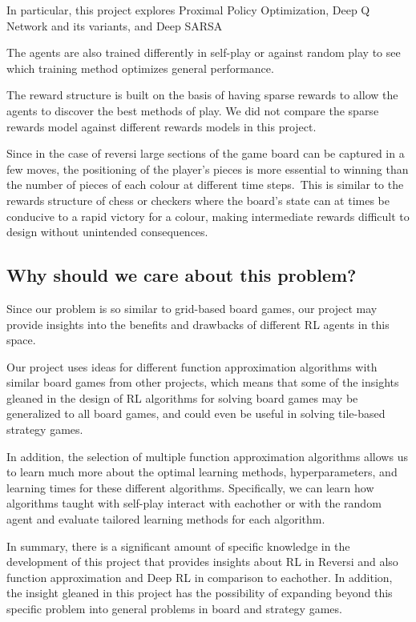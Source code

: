 \documentclass[../report.tex]{subfiles}
\begin{document}
In particular, this project explores Proximal Policy Optimization, Deep Q Network and its variants, and Deep SARSA


The agents are also trained differently in self-play or against random play to see which training method optimizes general performance.


The reward structure is built on the basis of having sparse rewards to allow the agents to discover the best methods of play.
We did not compare the sparse rewards model against different rewards models in this project.


Since in the case of reversi large sections of the game board can be captured in a few moves, the positioning of the player's pieces is more essential to winning than the number of pieces of each colour at different time steps.\
This is similar to the rewards structure of chess or checkers where the board's state can at times be conducive to a rapid victory for a colour, making intermediate rewards difficult to design without unintended consequences.


\subsection{Why should we care about this problem?}
\label{Why should we care about this problem?}


Since our problem is so similar to grid-based board games, our project may provide insights into the benefits and drawbacks of different RL agents in this space.


Our project uses ideas for different function approximation algorithms with similar board games from other projects,
which means that some of the insights gleaned in the design of RL algorithms for solving board games may be generalized to all board games, and could even be useful in solving tile-based strategy games.


In addition, the selection of multiple function approximation algorithms allows us to learn much more about the optimal learning methods, hyperparameters, and learning times for these different algorithms.
Specifically, we can learn how algorithms taught with self-play interact with eachother or with the random agent and evaluate tailored learning methods for each algorithm.


In summary, there is a significant amount of specific knowledge in the development of this project that provides insights about RL in Reversi
and also function approximation and Deep RL in comparison to eachother.
In addition, the insight gleaned in this project has the possibility of expanding beyond this specific problem into general problems in board and strategy games.
\end{document}
